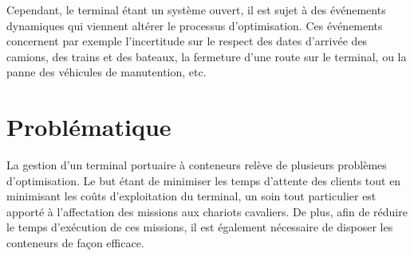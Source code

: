 \documentclass{roadef2010}
\begin{document}
Cependant, le terminal \'{e}tant un syst\`{e}me ouvert, il est sujet \`{a} des \'{e}v\'{e}nements dynamiques qui viennent alt\'{e}rer le processus d'optimisation.
Ces \'{e}v\'{e}nements concernent par exemple l'incertitude sur le respect des dates d'arriv\'{e}e des camions, des trains et des bateaux, la fermeture d'une route sur le terminal, ou la panne des v\'{e}hicules de manutention, etc.

\section{Probl\'ematique}
La gestion d'un terminal portuaire \`a conteneurs rel\`eve de plusieurs probl\`emes d'optimisation.
Le but \'{e}tant de minimiser les temps d'attente des clients tout en minimisant les co\^{u}ts d'exploitation du terminal, un soin tout particulier est apport\'{e} \`{a} l'affectation des missions aux chariots cavaliers.
De plus, afin de r\'{e}duire le temps d'ex\'{e}cution de ces missions, il est \'{e}galement n\'{e}cessaire de disposer les conteneurs de fa\c{c}on efficace.



\end{document}
